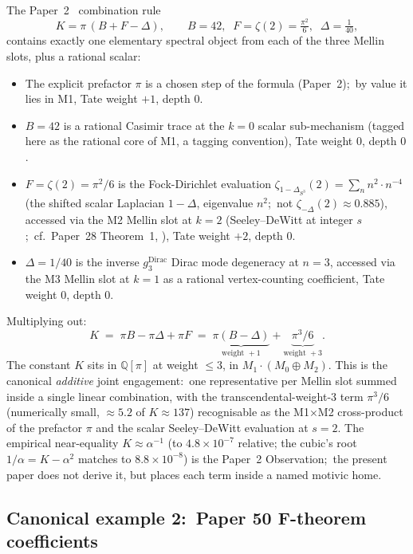 \documentclass[11pt,a4paper]{article}
\theoremstyle{plain}
\theoremstyle{definition}
\newcommand{\Q}{\mathbb{Q}}
\begin{document}
The Paper~2~\cite{loutey_paper2} combination rule
\begin{equation}
\label{eq:K_formula}
K = \pi\,(B + F - \Delta), \qquad
B = 42, \;\; F = \zeta(2) = \tfrac{\pi^2}{6}, \;\; \Delta = \tfrac{1}{40},
\end{equation}
contains exactly one elementary spectral object from each of the
three Mellin slots, plus a rational scalar:
\begin{itemize}
  \item The explicit prefactor $\pi$ is a chosen step of the formula
    (Paper~2);\ by value it lies in M1, Tate weight $+1$, depth $0$.
  \item $B = 42$ is a rational Casimir trace at the $k = 0$ scalar
    sub-mechanism (tagged here as the rational core of M1, a
    tagging convention), Tate weight $0$,
    depth $0$.
  \item $F = \zeta(2) = \pi^2/6$ is the Fock-Dirichlet evaluation
    $\zeta_{1-\Delta_{S^3}}(2) = \sum_n n^2 \cdot n^{-4}$ (the shifted
    scalar Laplacian $1 - \Delta$, eigenvalue $n^2$;\ not $\zeta_{-\Delta}(2)
    \approx 0.885$), accessed via the M2 Mellin
    slot at $k = 2$ (Seeley--DeWitt at integer $s$;\
    cf.\ Paper~28 Theorem~1, \cite{loutey_paper28}), Tate weight
    $+2$, depth $0$.
  \item $\Delta = 1/40$ is the inverse $g_3^{\mathrm{Dirac}}$ Dirac
    mode degeneracy at $n = 3$, accessed via the M3 Mellin slot at
    $k = 1$ as a rational vertex-counting coefficient, Tate weight
    $0$, depth $0$.
\end{itemize}
Multiplying out:
\[
K \;=\; \pi B - \pi\Delta + \pi F \;=\; \underbrace{\pi(B - \Delta)}_{\text{weight }+1} + \underbrace{\pi^3/6}_{\text{weight }+3}.
\]
The constant $K$ sits in $\Q[\pi]$ at weight $\le 3$, in
$M_1 \cdot (M_0 \oplus M_2)$.  This is the canonical \emph{additive}
joint engagement:\ one representative per Mellin slot summed inside
a single linear combination, with the transcendental-weight-3 term $\pi^3/6$ (numerically small, ${\approx}5.2$ of $K \approx 137$)
recognisable as the M1$\times$M2 cross-product of the prefactor $\pi$
and the scalar Seeley--DeWitt evaluation at $s = 2$.  The empirical
near-equality $K \approx \alpha^{-1}$ (to $4.8 \times 10^{-7}$ relative;
the cubic's root $1/\alpha = K - \alpha^2$ matches to $8.8\times10^{-8}$)
is the Paper~2 Observation;\ the present paper does not derive it,
but places each term inside a named motivic home.

\subsection{Canonical example 2:\ Paper 50 F-theorem coefficients}
\end{document}

